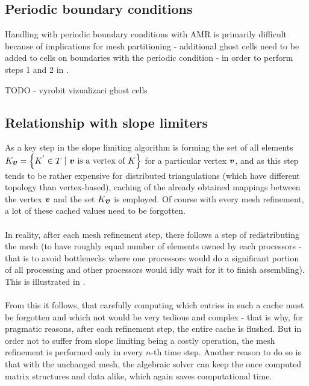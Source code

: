 \subsection{Periodic boundary conditions}
\label{amrPer}
Handling with periodic boundary conditions with AMR is primarily difficult because of implications for mesh partitioning - additional ghost cells need to be added to cells on boundaries with the periodic condition - in order to perform steps 1 and 2 in .

TODO - vyrobit vizualizaci ghost cells%

\subsection{Relationship with slope limiters}
As a key step in the slope limiting algorithm  is forming the set of all elements $K_{\bfv} = \left\{K^{'}\in T\ |\ \bfv \text{ is a vertex of } K\right\}$ for a particular vertex $\mbox{\boldmath $v$}$, and as this step tends to be rather expensive for distributed triangulations (which have different topology than vertex-based), caching of the already obtained mappings between the vertex $\mbox{\boldmath $v$}$ and the set $K_{\mbox{\boldmath $v$}}$ is employed. Of course with every mesh refinement, a lot of these cached values need to be forgotten.
\paragraph{}
In reality, after each mesh refinement step, there follows a step of redistributing the mesh (to have roughly equal number of elements owned by each processors - that is to avoid bottlenecks where one processors would do a significant portion of all processing and other processors would idly wait for it to finish assembling). This is illustrated in .
\paragraph{}
From this it follows, that carefully computing which entries in such a cache must be forgotten and which not would be very tedious and complex - that is why, for pragmatic reasons, after each refinement step, the entire cache is flushed. But in order not to suffer from slope limiting being a costly operation, the mesh refinement is performed only in every $n$-th time step. Another reason to do so is that with the unchanged mesh, the algebraic solver can keep the once computed matrix structures and data alike, which again saves computational time.